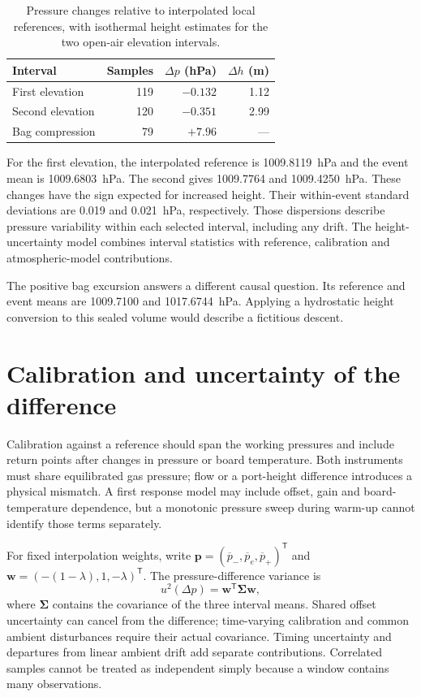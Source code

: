 \begin{table}[t]
\caption{Pressure changes relative to interpolated local references, with isothermal height estimates for the two open-air elevation intervals.}
\label{tab:pressure-example}
\centering\footnotesize
\begin{tabular}{@{}lrrr@{}}
\toprule
Interval & Samples & $\Delta p$ (hPa) & $\Delta h$ (m)\\
\midrule
First elevation & 119 & $-0.132$ & 1.12\\
Second elevation & 120 & $-0.351$ & 2.99\\
Bag compression & 79 & $+7.96$ & ---\\
\bottomrule
\end{tabular}
\end{table}

For the first elevation, the interpolated reference is 1009.8119~hPa and the event mean is 1009.6803~hPa. The second gives 1009.7764 and 1009.4250~hPa. These changes have the sign expected for increased height. Their within-event standard deviations are 0.019 and 0.021~hPa, respectively. Those dispersions describe pressure variability within each selected interval, including any drift. The height-uncertainty model combines interval statistics with reference, calibration and atmospheric-model contributions.

The positive bag excursion answers a different causal question. Its reference and event means are 1009.7100 and 1017.6744~hPa. Applying a hydrostatic height conversion to this sealed volume would describe a fictitious descent.

\section{Calibration and uncertainty of the difference}
Calibration against a reference should span the working pressures and include return points after changes in pressure or board temperature. Both instruments must share equilibrated gas pressure; flow or a port-height difference introduces a physical mismatch. A first response model may include offset, gain and board-temperature dependence, but a monotonic pressure sweep during warm-up cannot identify those terms separately.

For fixed interpolation weights, write $\mathbf p=(\overline p_-,\overline p_e,\overline p_+)^{\mathsf T}$ and $\mathbf w=(-(1-\lambda),1,-\lambda)^{\mathsf T}$. The pressure-difference variance is
\begin{equation}
 u^2(\Delta p)=\mathbf w^{\mathsf T}\boldsymbol\Sigma\mathbf w,
 \label{eq:pressure-covariance}
\end{equation}
where $\boldsymbol\Sigma$ contains the covariance of the three interval means\cite{gum}. Shared offset uncertainty can cancel from the difference; time-varying calibration and common ambient disturbances require their actual covariance. Timing uncertainty and departures from linear ambient drift add separate contributions. Correlated samples cannot be treated as independent simply because a window contains many observations.

